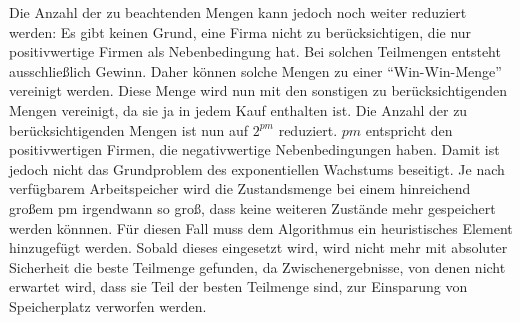 Die Anzahl der zu beachtenden Mengen kann jedoch noch weiter reduziert werden: Es gibt keinen Grund, eine Firma nicht zu berücksichtigen, die nur positivwertige Firmen als Nebenbedingung hat. Bei solchen Teilmengen entsteht ausschließlich Gewinn. Daher können solche Mengen zu einer "`Win-Win-Menge"' vereinigt werden. Diese Menge wird nun mit den sonstigen zu berücksichtigenden Mengen vereinigt, da sie ja in jedem Kauf enthalten ist. Die Anzahl der zu berücksichtigenden Mengen ist nun auf \(2^{pm}\) reduziert. \(pm\) entspricht den positivwertigen Firmen, die negativwertige Nebenbedingungen haben.
Damit ist jedoch nicht das Grundproblem des exponentiellen Wachstums beseitigt. Je nach verfügbarem Arbeitspeicher wird die Zustandsmenge bei einem hinreichend großem pm irgendwann so groß, dass keine weiteren Zustände mehr gespeichert werden könnnen.
Für diesen Fall muss dem Algorithmus ein heuristisches Element hinzugefügt werden. Sobald dieses eingesetzt wird, wird nicht mehr mit absoluter Sicherheit die beste Teilmenge gefunden, da Zwischenergebnisse, von denen nicht erwartet wird, dass sie Teil der besten Teilmenge sind, zur Einsparung von Speicherplatz verworfen werden.
